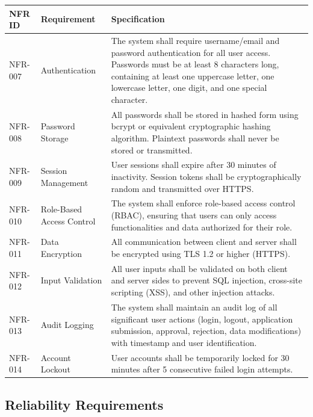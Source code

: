 \documentclass[12pt,a4paper,oneside]{report}
\begin{document}
\begin{table}[htbp]
\centering
\small
\begin{tabularx}{\textwidth}{l l X}
\toprule
\textbf{NFR ID} & \textbf{Requirement} & \textbf{Specification} \\
\midrule
NFR-007 & Authentication & The system shall require username/email and password authentication for all user access. Passwords must be at least 8 characters long, containing at least one uppercase letter, one lowercase letter, one digit, and one special character. \\
NFR-008 & Password Storage & All passwords shall be stored in hashed form using bcrypt or equivalent cryptographic hashing algorithm. Plaintext passwords shall never be stored or transmitted. \\
NFR-009 & Session Management & User sessions shall expire after 30 minutes of inactivity. Session tokens shall be cryptographically random and transmitted over HTTPS. \\
NFR-010 & Role-Based Access Control & The system shall enforce role-based access control (RBAC), ensuring that users can only access functionalities and data authorized for their role. \\
NFR-011 & Data Encryption & All communication between client and server shall be encrypted using TLS 1.2 or higher (HTTPS). \\
NFR-012 & Input Validation & All user inputs shall be validated on both client and server sides to prevent SQL injection, cross-site scripting (XSS), and other injection attacks. \\
NFR-013 & Audit Logging & The system shall maintain an audit log of all significant user actions (login, logout, application submission, approval, rejection, data modifications) with timestamp and user identification. \\
NFR-014 & Account Lockout & User accounts shall be temporarily locked for 30 minutes after 5 consecutive failed login attempts. \\
\bottomrule
\end{tabularx}
\end{table}

\subsection{Reliability Requirements}
\end{document}
